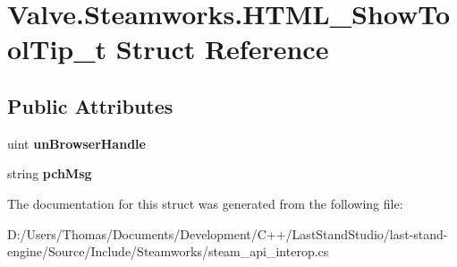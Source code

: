 \hypertarget{structValve_1_1Steamworks_1_1HTML__ShowToolTip__t}{}\section{Valve.\+Steamworks.\+H\+T\+M\+L\+\_\+\+Show\+Tool\+Tip\+\_\+t Struct Reference}
\label{structValve_1_1Steamworks_1_1HTML__ShowToolTip__t}
\subsection*{Public Attributes}
\begin{DoxyCompactItemize}
\item 
\hypertarget{structValve_1_1Steamworks_1_1HTML__ShowToolTip__t_a3fb6e79e2dd3b0d1dc31ddd0cdee3727}{}uint {\bfseries un\+Browser\+Handle}\label{structValve_1_1Steamworks_1_1HTML__ShowToolTip__t_a3fb6e79e2dd3b0d1dc31ddd0cdee3727}

\item 
\hypertarget{structValve_1_1Steamworks_1_1HTML__ShowToolTip__t_a551bcee65683f44fc57bdab66827e362}{}string {\bfseries pch\+Msg}\label{structValve_1_1Steamworks_1_1HTML__ShowToolTip__t_a551bcee65683f44fc57bdab66827e362}

\end{DoxyCompactItemize}


The documentation for this struct was generated from the following file\+:\begin{DoxyCompactItemize}
\item 
D\+:/\+Users/\+Thomas/\+Documents/\+Development/\+C++/\+Last\+Stand\+Studio/last-\/stand-\/engine/\+Source/\+Include/\+Steamworks/steam\+\_\+api\+\_\+interop.\+cs\end{DoxyCompactItemize}
